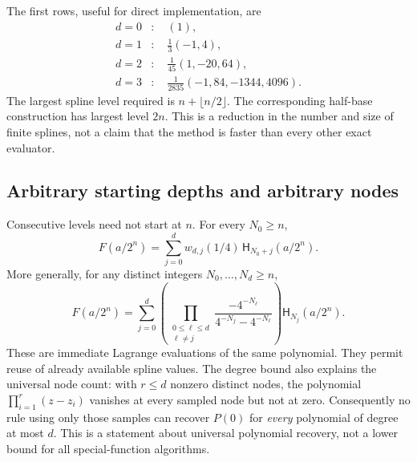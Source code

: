 \documentclass[11pt,oneside]{article}
\theoremstyle{definition}\newtheorem{definition}[theorem]{Definition}
\theoremstyle{remark}\newtheorem{remark}[theorem]{Remark}
\begin{document}
The first rows, useful for direct implementation, are
\begin{align*}
 d=0 &: \quad (1),\\
 d=1 &: \quad \frac13(-1,4),\\
 d=2 &: \quad \frac1{45}(1,-20,64),\\
 d=3 &: \quad \frac1{2835}(-1,84,-1344,4096).
\end{align*}
The largest spline level required is $n+\lfloor n/2\rfloor$.
The corresponding half-base construction has largest level $2n$.
This is a reduction in the number and size of finite splines, not a claim
that the method is faster than every other exact evaluator.

\subsection{Arbitrary starting depths and arbitrary nodes}
Consecutive levels need not start at $n$. For every $N_0\ge n$,
\begin{equation}
 F(a/2^n)=\sum_{j=0}^{d}w_{d,j}(1/4)\,
                  \mathsf H_{N_0+j}(a/2^n).
 \label{eq:quarterstart}
\end{equation}
More generally, for any distinct integers $N_0,\ldots,N_d\ge n$,
\begin{equation}
 F(a/2^n)=\sum_{j=0}^{d}
 \left(\prod_{\substack{0\le\ell\le d\\\ell\ne j}}
 \frac{-4^{-N_\ell}}{4^{-N_j}-4^{-N_\ell}}\right)
 \mathsf H_{N_j}(a/2^n).
 \label{eq:arbitrarycutoffs}
\end{equation}
These are immediate Lagrange evaluations of the same polynomial. They permit
reuse of already available spline values. The degree bound also explains the
universal node count: with $r\le d$ nonzero distinct nodes, the polynomial
$\prod_{i=1}^r(z-z_i)$ vanishes at every sampled node but not at zero.
Consequently no rule using only those samples can recover $P(0)$ for
\emph{every} polynomial of degree at most $d$. This is a statement about
universal polynomial recovery, not a lower bound for all special-function
algorithms.
\end{document}
